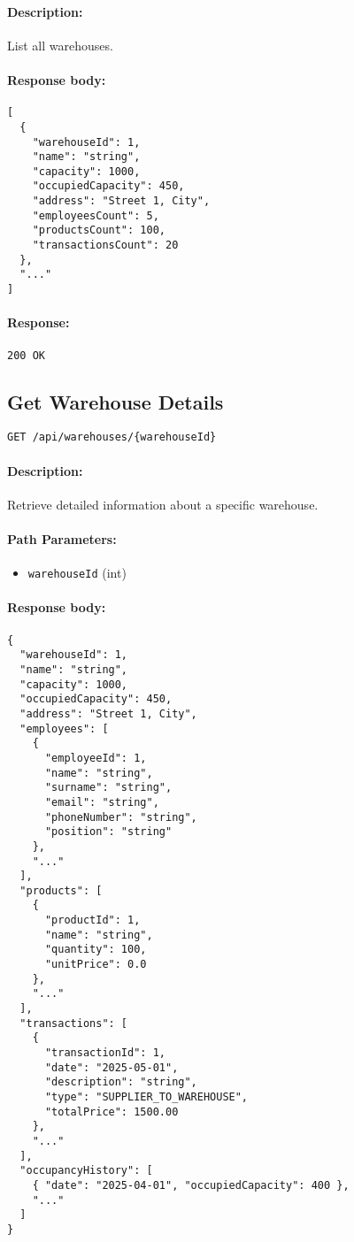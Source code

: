 \documentclass[a4paper,11pt]{article}
\begin{document}
\paragraph{Description:} List all warehouses.
\paragraph{Response body:}
\begin{verbatim}
[
  {
    "warehouseId": 1,
    "name": "string",
    "capacity": 1000,
    "occupiedCapacity": 450,
    "address": "Street 1, City",
    "employeesCount": 5,
    "productsCount": 100,
    "transactionsCount": 20
  },
  "..."
]
\end{verbatim}
\paragraph{Response:} \texttt{200 OK}

\subsection{Get Warehouse Details}
\label{sec:warehouses-details}
\begin{verbatim}
GET /api/warehouses/{warehouseId}
\end{verbatim}
\paragraph{Description:} Retrieve detailed information about a specific warehouse.
\paragraph{Path Parameters:}
\begin{itemize}
  \item \texttt{warehouseId} (int)
\end{itemize}
\paragraph{Response body:}
\begin{verbatim}
{
  "warehouseId": 1,
  "name": "string",
  "capacity": 1000,
  "occupiedCapacity": 450,
  "address": "Street 1, City",
  "employees": [
    {
      "employeeId": 1,
      "name": "string",
      "surname": "string",
      "email": "string",
      "phoneNumber": "string",
      "position": "string"
    },
    "..."
  ],
  "products": [
    {
      "productId": 1,
      "name": "string",
      "quantity": 100,
      "unitPrice": 0.0
    },
    "..."
  ],
  "transactions": [
    {
      "transactionId": 1,
      "date": "2025-05-01",
      "description": "string",
      "type": "SUPPLIER_TO_WAREHOUSE",
      "totalPrice": 1500.00
    },
    "..."
  ],
  "occupancyHistory": [
    { "date": "2025-04-01", "occupiedCapacity": 400 },
    "..."
  ]
}
\end{verbatim}
\end{document}
